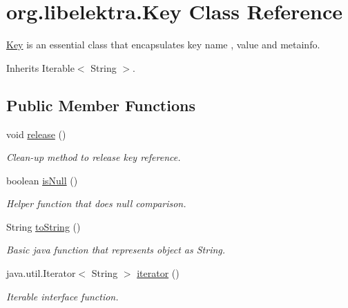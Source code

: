\hypertarget{classorg_1_1libelektra_1_1Key}{}\section{org.\+libelektra.\+Key Class Reference}
\label{classorg_1_1libelektra_1_1Key}


\mbox{\hyperlink{classorg_1_1libelektra_1_1Key}{Key}} is an essential class that encapsulates key name , value and metainfo.  




Inherits Iterable$<$ String $>$.

\subsection*{Public Member Functions}
\begin{DoxyCompactItemize}
\item 
\mbox{\label{classorg_1_1libelektra_1_1Key_a8e93661372c9a6d5d23a056265a6f5a5}} 
void \mbox{\hyperlink{classorg_1_1libelektra_1_1Key_a8e93661372c9a6d5d23a056265a6f5a5}{release}} ()
\begin{DoxyCompactList}\small\item\em Clean-\/up method to release key reference. \end{DoxyCompactList}\item 
boolean \mbox{\hyperlink{classorg_1_1libelektra_1_1Key_adfcebdd407d050b0626a8f2cfec00e8b}{is\+Null}} ()
\begin{DoxyCompactList}\small\item\em Helper function that does null comparison. \end{DoxyCompactList}\item 
String \mbox{\hyperlink{classorg_1_1libelektra_1_1Key_a2814202c93e4f4dac842b2d4856ba78e}{to\+String}} ()
\begin{DoxyCompactList}\small\item\em Basic java function that represents object as String. \end{DoxyCompactList}\item 
java.\+util.\+Iterator$<$ String $>$ \mbox{\hyperlink{classorg_1_1libelektra_1_1Key_ad948a4ab2d5142b439830ddc5c16cc38}{iterator}} ()
\begin{DoxyCompactList}\small\item\em Iterable interface function. \end{DoxyCompactList}\item 

\end{DoxyCompactItemize}
